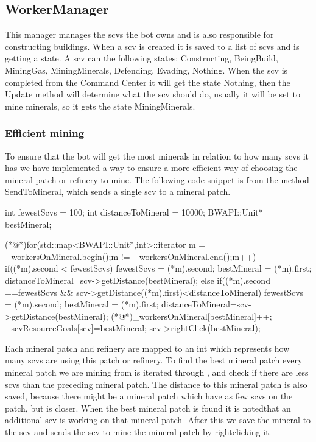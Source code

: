 	\subsection{WorkerManager}
		This manager manages the scvs the bot owns and is also responsible for constructing buildings. When a scv is created it is saved to a list of 
		scvs and is getting a state. A scv can the following states: Constructing, BeingBuild, MiningGas, MiningMinerals, Defending, Evading, Nothing. When 
		the scv is completed from the Command Center it will get the state Nothing, then the Update method will determine what the scv should do, usually 
		it will be set to mine minerals, so it gets the state MiningMinerals. 
		\subsubsection*{Efficient mining}
			To ensure that the bot will get the most minerals in relation to how many scvs it has we have implemented a way to ensure a more efficient 
			way of choosing the mineral patch or refinery to mine. The following code snippet is from the method SendToMineral, which sends a single scv 
			to a mineral patch.
			
				\begin{Sourcecode}[caption=SendToMineral method]
	int fewestScvs = 100;
	int distanceToMineral = 10000;
	BWAPI::Unit* bestMineral;

	(*@\lnote@*)for(std::map<BWAPI::Unit*,int>::iterator m = _workersOnMineral.begin();m != _workersOnMineral.end();m++)
	{
		if((*m).second < fewestScvs)
		{
			fewestScvs = (*m).second;
			bestMineral = (*m).first;
			distanceToMineral=scv->getDistance(bestMineral);
		}
		else if((*m).second ==fewestScvs && scv->getDistance((*m).first)<distanceToMineral)
		{
			fewestScvs = (*m).second;
			bestMineral = (*m).first;
			distanceToMineral=scv->getDistance(bestMineral);
		}
	}
	(*@\lnote@*)_workersOnMineral[bestMineral]++;
	_scvResourceGoals[scv]=bestMineral;
	scv->rightClick(bestMineral);
				\end{Sourcecode}
			Each mineral patch and refinery are mapped to an int which represents how many scvs are using this patch or refinery. To find the best mineral 
			patch every mineral patch we are mining from is iterated through , and check if there are less scvs than the preceding mineral patch. 
			The distance to this mineral patch is also saved, because there might be a mineral patch which have as few scvs on the patch, but is closer. 
			When the best mineral patch is found it is notedthat an additional scv is working on that mineral patch- After this we save the 
			mineral to the scv and sends the scv to mine the mineral patch by rightclicking it.
			
